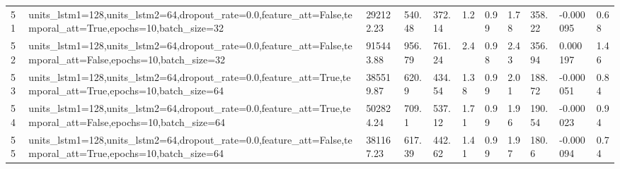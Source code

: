 \begin{longtable}{C{0.8cm} L{2cm} C{1.15cm} C{1.15cm} C{1.15cm} C{1.15cm} C{0.85cm} C{1.25cm} C{1.2cm} C{1.5cm} C{1.0cm}}
51 & units\_lstm1=128,\newline units\_lstm2=64,\newline dropout\_rate=0.0,\newline feature\_att=False,\newline temporal\_att=True,\newline epochs=10,\newline batch\_size=32 & 292122.23 & 540.48 & 372.14 & 1.2 & 0.99 & 1.78 & 358.22 & -0.000095 & 0.68 \\
52 & units\_lstm1=128,\newline units\_lstm2=64,\newline dropout\_rate=0.0,\newline feature\_att=False,\newline temporal\_att=False,\newline epochs=10,\newline batch\_size=32 & 915443.88 & 956.79 & 761.24 & 2.4 & 0.98 & 2.43 & 356.94 & 0.000197 & 1.46 \\
53 & units\_lstm1=128,\newline units\_lstm2=64,\newline dropout\_rate=0.0,\newline feature\_att=True,\newline temporal\_att=True,\newline epochs=10,\newline batch\_size=64 & 385519.87 & 620.9 & 434.54 & 1.38 & 0.99 & 2.01 & 188.72 & -0.000051 & 0.84 \\
54 & units\_lstm1=128,\newline units\_lstm2=64,\newline dropout\_rate=0.0,\newline feature\_att=True,\newline temporal\_att=False,\newline epochs=10,\newline batch\_size=64 & 502824.24 & 709.1 & 537.12 & 1.71 & 0.99 & 1.96 & 190.54 & -0.000023 & 0.94 \\
55 & units\_lstm1=128,\newline units\_lstm2=64,\newline dropout\_rate=0.0,\newline feature\_att=False,\newline temporal\_att=True,\newline epochs=10,\newline batch\_size=64 & 381167.23 & 617.39 & 442.62 & 1.41 & 0.99 & 1.97 & 180.6 & -0.000094 & 0.74 \\

\end{longtable}
